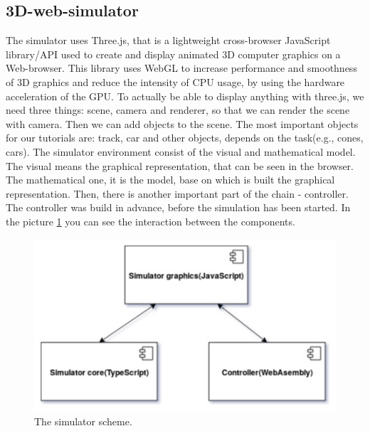 \subsection{3D-web-simulator}
The simulator uses Three.js\cite{ThreeJS}, that is a lightweight cross-browser JavaScript library/API used to create and display animated 3D computer graphics on a Web-browser. This library uses WebGL\cite{WebGL} to increase performance and smoothness of 3D graphics and reduce the intensity of CPU usage, by using the hardware acceleration of the GPU.\newline
To actually be able to display anything with three.js, we need three things: scene, camera and renderer, so that we can render the scene with camera. Then we can add objects to the scene. The most important objects for our tutorials are: track, car and other objects, depends on the task(e.g., cones, cars).\newline
The simulator environment consist of the visual and mathematical model. The visual means the graphical representation, that can be seen in the browser. The mathematical one, it is the model, base on which is built the graphical representation. Then, there is another important part of the chain - controller. The controller was build in advance, before the simulation has been started. In the picture \ref{fig:simulator-scheme} you can see the interaction between the components.
\begin{figure}[h!]
    \centering
    \includegraphics[width=0.7\linewidth]{src/pic/simulator-scheme}
    \caption{The simulator scheme.}
    \label{fig:simulator-scheme}
\end{figure}
